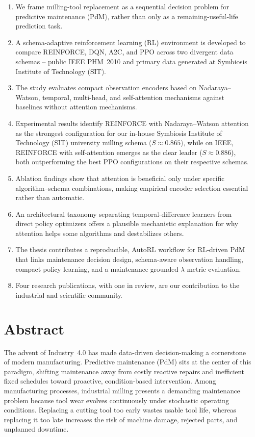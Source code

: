 \documentclass[12pt,oneside]{book}
\begin{document}
\begin{enumerate}[leftmargin=*]
    \item We frame milling-tool replacement as a sequential decision problem for predictive maintenance (PdM), rather than only as a remaining-useful-life prediction task.
    \item A schema-adaptive reinforcement learning (RL) environment is developed to compare \textsc{REINFORCE}, DQN, A2C, and PPO across two divergent data schemas -- public IEEE PHM~2010 and primary data generated at Symbiosis Institute of Technology (SIT).
	\item The study evaluates compact observation encoders based on Nadaraya--Watson, temporal, multi-head, and self-attention mechanisms against baselines without attention mechanisms.
	\item Experimental results identify \textsc{REINFORCE} with Nadaraya--Watson attention as the strongest configuration for our in-house Symbiosis Institute of Technology (SIT) university milling schema ($S\approx0.865$), while on IEEE, \textsc{REINFORCE} with self-attention emerges as the clear leader ($S\approx0.886$), both outperforming the best \textsc{PPO} configurations on their respective schemas.
	\item Ablation findings show that attention is beneficial only under specific algorithm--schema combinations, making empirical encoder selection essential rather than automatic.
    \item An architectural taxonomy separating temporal-difference learners from direct policy optimizers offers a plausible mechanistic explanation for why attention helps some algorithms and destabilizes others.
    \item The thesis contributes a reproducible, AutoRL workflow for RL-driven PdM that links maintenance decision design, schema-aware observation handling, compact policy learning, and a maintenance-grounded $\lambda$ metric evaluation.
    \item Four research publications, with one in review, are our contribution to the industrial and scientific community. 
\end{enumerate}

\chapter*{Abstract}

The advent of Industry~4.0 has made data-driven decision-making a cornerstone of modern manufacturing. Predictive maintenance (PdM) sits at the center of this paradigm, shifting maintenance away from costly reactive repairs and inefficient fixed schedules toward proactive, condition-based intervention. Among manufacturing processes, industrial milling presents a demanding maintenance problem because tool wear evolves continuously under stochastic operating conditions. Replacing a cutting tool too early wastes usable tool life, whereas replacing it too late increases the risk of machine damage, rejected parts, and unplanned downtime.
\end{document}
